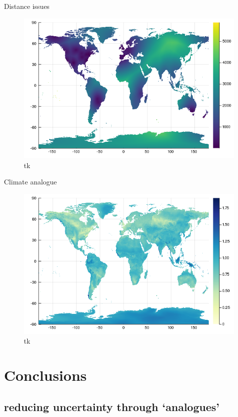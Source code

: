 Distance issues

\begin{figure}
\centering
\includegraphics{figures/figure_03_a.png}
\caption{tk\label{fig:distance}}
\end{figure}

Climate analogue

\begin{figure}
\centering
\includegraphics{figures/figure_03_b.png}
\caption{tk\label{fig:analog}}
\end{figure}

\hypertarget{conclusions}{%
\section{Conclusions}\label{conclusions}}

\hypertarget{reducing-uncertainty-through-analogues}{%
\subsection{reducing uncertainty through
`analogues'}\label{reducing-uncertainty-through-analogues}}

